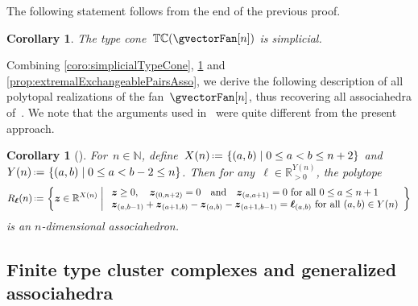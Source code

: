 \documentclass{amsart}
\newtheorem{corollary}[theorem]{Corollary}
\theoremstyle{definition}
\newcommand{\R}{\mathbb{R}} %
\newcommand{\N}{\mathbb{N}} %
\renewcommand{\b}[1]{{\boldsymbol{#1}}} %
\newcommand{\set}[2]{\left\{ #1 \;\middle|\; #2 \right\}} %
\newcommand{\bigset}[2]{\big\{ #1 \;\big|\; #2 \big\}} %
\newcommand{\eqdef}{\mbox{\,\raisebox{0.2ex}{\scriptsize\ensuremath{\mathrm:}}\ensuremath{=}\,}} %
\newcommand{\typeCone}{\mathbb{TC}} %
\begin{document}
The following statement follows from the end of the previous proof.

\begin{corollary}
\label{coro:simplicialTypeConeAsso}
The type cone~$\typeCone(\gvectorFan[n])$ is simplicial.
\end{corollary}

Combining \cref{coro:simplicialTypeCone}, \cref{coro:simplicialTypeConeAsso} and \cref{prop:extremalExchangeablePairsAsso}, we derive the following description of all polytopal realizations of the fan~$\gvectorFan[n]$, thus recovering all associahedra of~\cite[Sect.~3.2]{ArkaniHamedBaiHeYan}.
We note that the arguments used in~\cite[Sect.~3.2]{ArkaniHamedBaiHeYan} were quite different from the present approach.

\begin{corollary}[{\cite[Sect.~3.2]{ArkaniHamedBaiHeYan}}]
For~$n \in \N$, define~$X(n) \eqdef \set{(a,b)}{0 \le a < b \le n+2}$ and~$Y(n) \eqdef \set{(a,b)}{0 \le a < b-2 \le n}$.
Then for any~$\b{\ell} \in \R_{>0}^{Y(n)}$, the polytope
\[
R_\b{\ell}(n) \eqdef \set{\b{z} \in \R^{X(n)}}{\begin{array}{l} \b{z} \ge 0, \quad \b{z}_{(0,n+2)} = 0 \quad\text{and}\quad \b{z}_{(a,a+1)} = 0 \text{ for all } 0 \le a \le n+1 \\ \b{z}_{(a,b-1)} + \b{z}_{(a+1,b)} - \b{z}_{(a,b)} - \b{z}_{(a+1,b-1)} = \b{\ell}_{(a,b)} \text{ for all } (a,b) \in Y(n) \end{array}}
\]
is an $n$-dimensional associahedron.
\end{corollary}


\subsection{Finite type cluster complexes and generalized associahedra}
\end{document}

